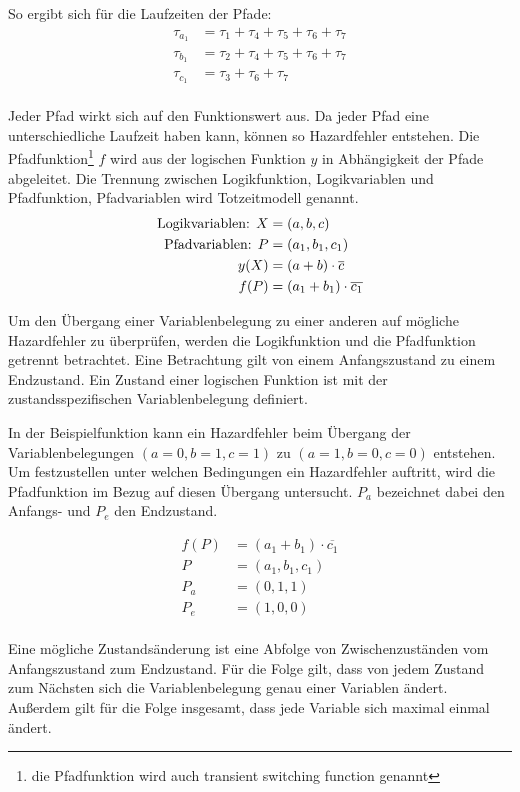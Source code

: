 So ergibt sich für die Laufzeiten der Pfade:
\begin{align*}
	\tau_{a_1} &= \tau_1 + \tau_4 + \tau_5 + \tau_6 + \tau_7 \\
	\tau_{b_1} &= \tau_2 + \tau_4 + \tau_5 + \tau_6 + \tau_7 \\
	\tau_{c_1} &= \tau_3 + \tau_6 + \tau_7 \\
\end{align*}

Jeder Pfad wirkt sich auf den Funktionswert aus. Da jeder Pfad eine unterschiedliche Laufzeit haben kann, können so Hazardfehler entstehen. Die Pfadfunktion\footnote{die Pfadfunktion wird auch transient switching function genannt} $f$ wird aus der logischen Funktion $y$ in Abhängigkeit der Pfade abgeleitet. Die Trennung zwischen Logikfunktion, Logikvariablen und Pfadfunktion, Pfadvariablen wird Totzeitmodell genannt.
\begin{align*}
	\textnormal{Logikvariablen: } X &= (a, b, c) \\
	\textnormal{Pfadvariablen: } P &= (a_1, b_1, c_1) \\
	y(X) &= (a + b) \cdot \overline{c} \\
	f(P) &= (a_1 + b_1) \cdot \overline{c_1} \\	
\end{align*}  

Um den Übergang einer Variablenbelegung zu einer anderen auf mögliche Hazardfehler zu überprüfen, werden die Logikfunktion und die Pfadfunktion getrennt betrachtet. Eine Betrachtung gilt von einem Anfangszustand zu einem Endzustand. Ein Zustand einer logischen Funktion ist mit der zustandsspezifischen Variablenbelegung definiert.

In der Beispielfunktion kann ein Hazardfehler beim Übergang der Variablenbelegungen $(a=0, b=1, c=1)$ zu $(a=1, b=0, c=0)$ entstehen. Um festzustellen unter welchen Bedingungen ein Hazardfehler auftritt, wird die Pfadfunktion im Bezug auf diesen Übergang untersucht. $P_a$ bezeichnet dabei den Anfangs- und $P_e$ den Endzustand.

\begin{align*}
	f(P) &= (a_1 + b_1) \cdot \overline{c_1} \\
	P    &= (a_1, b_1, c_1) \\
	P_a  &= (0,1,1) \\
	P_e  &= (1,0,0) \\
\end{align*}

Eine mögliche Zustandsänderung ist eine Abfolge von Zwischenzuständen vom Anfangszustand zum Endzustand. Für die Folge gilt, dass von jedem Zustand zum Nächsten sich die Variablenbelegung genau einer Variablen ändert. Außerdem gilt für die Folge insgesamt, dass jede Variable sich maximal einmal ändert. 

